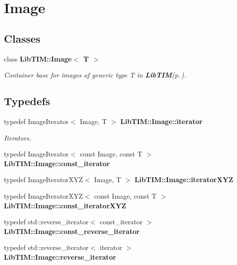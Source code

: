 \section{Image}
\label{group__Image}
\subsection*{Classes}
\begin{CompactItemize}
\item 
class {\bf Lib\-TIM::Image$<$ T $>$}
\begin{CompactList}\small\item\em Container base for images of generic type T in {\bf Lib\-TIM}{\rm (p.\,\pageref{namespaceLibTIM})}. \item\end{CompactList}\end{CompactItemize}
\subsection*{Typedefs}
\begin{CompactItemize}
\item 
typedef Image\-Iterator$<$ Image, T $>$ {\bf Lib\-TIM::Image::iterator}
\begin{CompactList}\small\item\em Iterators. \item\end{CompactList}\item 
typedef Image\-Iterator$<$ const Image, const T $>$ {\bf Lib\-TIM::Image::const\_\-iterator}
\item 
typedef Image\-Iterator\-XYZ$<$ Image, T $>$ {\bf Lib\-TIM::Image::iterator\-XYZ}
\item 
typedef Image\-Iterator\-XYZ$<$ const Image, const T $>$ {\bf Lib\-TIM::Image::const\_\-iterator\-XYZ}
\item 
typedef std::reverse\_\-iterator$<$ const\_\-iterator $>$ {\bf Lib\-TIM::Image::const\_\-reverse\_\-iterator}
\item 
typedef std::reverse\_\-iterator$<$ iterator $>$ {\bf Lib\-TIM::Image::reverse\_\-iterator}
\end{CompactItemize}
